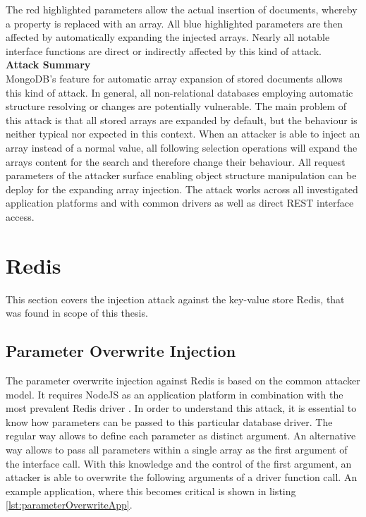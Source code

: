 The red highlighted parameters allow the actual insertion of documents, whereby a property is replaced with an array. All blue highlighted parameters are then affected by automatically expanding the injected arrays. Nearly all notable interface functions are direct or indirectly affected by this kind of attack. \\

\textbf{Attack Summary} \\
MongoDB's feature for automatic array expansion of stored documents allows this kind of attack. In general, all non-relational databases employing automatic structure resolving or changes are potentially vulnerable. The main problem of this attack is that all stored arrays are expanded by default, but the behaviour is neither typical nor expected in this context. When an attacker is able to inject an array instead of a normal value, all following selection operations will expand the arrays content for the search and therefore change their behaviour. All request parameters of the attacker surface enabling object structure manipulation can be deploy for the expanding array injection. The attack works across all investigated application platforms and with common drivers as well as direct REST interface access. 

\section{Redis}
This section covers the injection attack against the key-value store Redis, that was found in scope of this thesis.

\subsection{Parameter Overwrite Injection}
The parameter overwrite injection against Redis is based on the common attacker model. It requires NodeJS as an application platform in combination with the most prevalent Redis driver \cite{Ranney2016}. In order to understand this attack, it is essential to know how parameters can be passed to this particular database driver. The regular way allows to define each parameter as distinct argument. An alternative way allows to pass all parameters within a single array as the first argument of the interface call. With this knowledge and the control of the first argument, an attacker is able to overwrite the following arguments of a driver function call. An example application, where this becomes critical is shown in listing \ref{lst:parameterOverwriteApp}. \\

